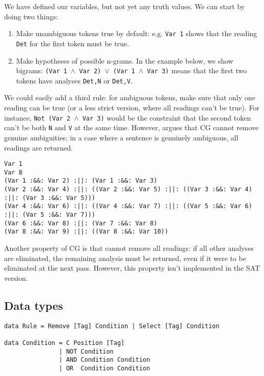 \documentclass[a4paper, 11pt]{article}
\begin{document}
We have defined our variables, but not yet any truth values. We can
start by doing two things:
\begin{enumerate}
\item Make unambiguous tokens true by default: e.g. \texttt{Var 1}
  shows that the reading \texttt{Det} for the first token must be true.
\item Make hypotheses of possible n-grams. In the example below, we
show bigrams: \texttt{(Var 1 $\wedge$ Var 2) $\vee$ (Var 1 $\wedge$ Var 3)}
means that the first two tokens have analyses \texttt{Det,N} or
\texttt{Det,V}.
\end{enumerate}

We could easily add a third rule: for ambiguous tokens, make sure that
only one reading can be true (or a less strict version, where all
readings can't be true). For instance, \texttt{Not (Var 2 $\wedge$ Var
  3)} would be the constraint that the second token can't be both
\texttt{N} and \texttt{V} at the same time. However,
\cite{KarlssonTODO} argues that CG cannot remove genuine ambiguities;
in a case where a sentence is genuinely ambiguous, all readings are
returned.



\begin{lstlisting}
Var 1
Var 8
(Var 1 :&&: Var 2) :||: (Var 1 :&&: Var 3)
(Var 2 :&&: Var 4) :||: ((Var 2 :&&: Var 5) :||: ((Var 3 :&&: Var 4) :||: (Var 3 :&&: Var 5)))
(Var 4 :&&: Var 6) :||: ((Var 4 :&&: Var 7) :||: ((Var 5 :&&: Var 6) :||: (Var 5 :&&: Var 7)))
(Var 6 :&&: Var 8) :||: (Var 7 :&&: Var 8)
(Var 8 :&&: Var 9) :||: ((Var 8 :&&: Var 10))
\end{lstlisting}

Another property of CG is that cannot remove all readings: if all
other analyses are eliminated, the remaining analysis must be
returned, even if it were to be eliminated at the next pass. 
However, this property isn't implemented in the SAT version.

\subsection{Data types}

\begin{lstlisting}
data Rule = Remove [Tag] Condition | Select [Tag] Condition

data Condition = C Position [Tag]
               | NOT Condition
               | AND Condition Condition
               | OR  Condition Condition 
\end{lstlisting}
\end{document}
